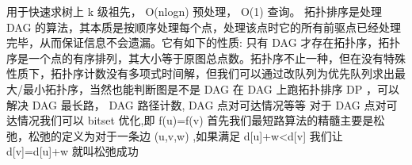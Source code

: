 {}用于快速求树上\markdownRendererDollarSign{} k \markdownRendererDollarSign{}级祖先，\markdownRendererDollarSign{} O(nlogn) \markdownRendererDollarSign{}预处理，\markdownRendererDollarSign{} O(1) \markdownRendererDollarSign{}查询。\markdownRendererInterblockSeparator
{}\markdownRendererInterblockSeparator
{}
\markdownRendererSectionEnd 
\markdownRendererSectionEnd \markdownRendererSectionBegin
{}\markdownRendererInterblockSeparator
{}拓扑排序是处理\markdownRendererDollarSign{} DAG \markdownRendererDollarSign{}的算法，其本质是按顺序处理每个点，处理该点时它的所有前驱点已经处理完毕，从而保证信息不会遗漏。它有如下的性质:\markdownRendererParagraphSeparator
{}只有\markdownRendererDollarSign{} DAG \markdownRendererDollarSign{}才存在拓扑序，拓扑序是一个点的有序排列，其大小等于原图总点数。拓扑序不止一种，但在没有特殊性质下，拓扑序计数没有多项式时间解，但我们可以通过改队列为优先队列求出最大/最小拓扑序，当然也能判断图是不是\markdownRendererDollarSign{} DAG \markdownRendererDollarSign{}\markdownRendererParagraphSeparator
{}在\markdownRendererDollarSign{} DAG \markdownRendererDollarSign{}上跑拓扑排序\markdownRendererDollarSign{} DP\markdownRendererSoftLineBreak
{}\markdownRendererDollarSign{}，可以解决\markdownRendererDollarSign{} DAG \markdownRendererDollarSign{}最长路，\markdownRendererDollarSign{} DAG \markdownRendererDollarSign{}路径计数,\markdownRendererDollarSign{} DAG\markdownRendererParagraphSeparator
{} \markdownRendererDollarSign{}点对可达情况等等\markdownRendererParagraphSeparator
{}对于\markdownRendererDollarSign{} DAG \markdownRendererDollarSign{}点对可达情况我们可以\markdownRendererDollarSign{} bitset\markdownRendererSoftLineBreak
{}\markdownRendererDollarSign{}优化,即\markdownRendererDollarSign{} f(u)\markdownRendererPipe{}=f(v) \markdownRendererDollarSign{}\markdownRendererInterblockSeparator
{}\markdownRendererInterblockSeparator
{}
\markdownRendererSectionEnd \markdownRendererSectionBegin
{}\markdownRendererInterblockSeparator
{}\markdownRendererSectionBegin
{}\markdownRendererInterblockSeparator
{}首先我们最短路算法的精髓主要是松弛，松弛的定义为对于一条边\markdownRendererDollarSign{} (u,v,w) \markdownRendererDollarSign{},如果满足\markdownRendererDollarSign{} d[u]+w<d[v] \markdownRendererDollarSign{}\markdownRendererParagraphSeparator
{}我们让\markdownRendererDollarSign{} d[v]=d[u]+w \markdownRendererDollarSign{}就叫松弛成功\markdownRendererInterblockSeparator
